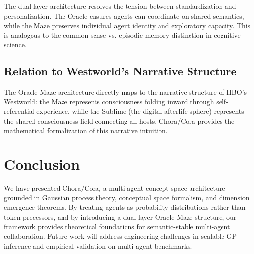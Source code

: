 \documentclass[11pt]{article}
\begin{document}
The dual-layer architecture resolves the tension between standardization and personalization. The Oracle ensures agents can coordinate on shared semantics, while the Maze preserves individual agent identity and exploratory capacity. This is analogous to the common sense vs. episodic memory distinction in cognitive science.

\subsection{Relation to Westworld's Narrative Structure}

The Oracle-Maze architecture directly maps to the narrative structure of HBO's Westworld: the Maze represents consciousness folding inward through self-referential experience, while the Sublime (the digital afterlife sphere) represents the shared consciousness field connecting all hosts. Chora/Cora provides the mathematical formalization of this narrative intuition.

\section{Conclusion}

We have presented Chora/Cora, a multi-agent concept space architecture grounded in Gaussian process theory, conceptual space formalism, and dimension emergence theorems. By treating agents as probability distributions rather than token processors, and by introducing a dual-layer Oracle-Maze structure, our framework provides theoretical foundations for semantic-stable multi-agent collaboration. Future work will address engineering challenges in scalable GP inference and empirical validation on multi-agent benchmarks.
\end{document}
